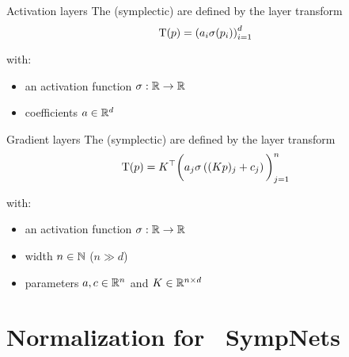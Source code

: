 \begin{frame}[c]{Activation layers}
  The (symplectic)  are defined by the layer transform
  \begin{equation*}
    \mathrm{T}(p) = \left( a_i \sigma(p_i) \right)_{i=1}^d
  \end{equation*}

  with:
  \begin{itemize}
    \item an activation function $\sigma : \mathbb{R} \to \mathbb{R}$
    \item coefficients $a \in \mathbb{R}^d$ 
  \end{itemize}
\end{frame}

\begin{frame}[c]{Gradient layers}
  The (symplectic)  are defined by the layer transform
  \begin{equation*}
    \mathrm{T}(p) = K^\top \bigg( a_j \sigma \left( (Kp)_j + c_j \right) \bigg)_{j=1}^n
  \end{equation*}

  with:
  \begin{itemize}
    \item an activation function $\sigma : \mathbb{R} \to \mathbb{R}$
    \item width $n \in \mathbb{N}$ ($n \gg d$)
    \item parameters $a,c \in \mathbb{R}^n$ and $K \in \mathbb{R}^{n \times d}$
  \end{itemize}
\end{frame}

\section{Normalization for ~\newline SympNets}

